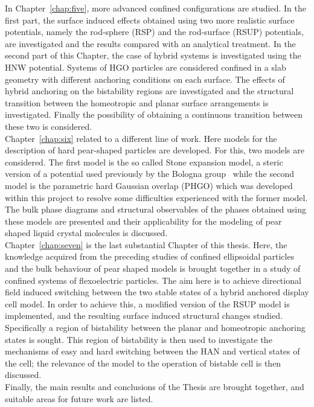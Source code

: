 In Chapter~\ref{chap:five}, more advanced confined configurations are studied. In the first part,
the surface induced effects obtained using two more realistic surface potentials, namely the rod-sphere
(RSP) and the rod-surface (RSUP) potentials, are investigated and the results compared
with an analytical treatment.
In the second part of this Chapter, the case of hybrid systems is investigated using the HNW
potential. Systems of HGO particles are considered confined in a slab geometry with different 
anchoring conditions on each surface. The effects of hybrid anchoring on the bistability regions
are investigated and the structural transition between the homeotropic and planar surface
arrangements is investigated.  Finally the possibility of obtaining a continuous transition
between these two is considered.\\

Chapter~\ref{chap:six} related to a different line of work. Here models for the description of hard
pear-shaped particles are developed. For this, two models are considered. The first model is
the so called Stone expansion model,  a steric version of a potential used previously by
the Bologna group~\cite{BerardiRicci01} while the second model is the parametric hard Gaussian 
overlap (PHGO) which was developed within
this project to resolve some difficulties experienced with the former model. The bulk phase diagrams
and structural observables of the phases obtained using these models are presented and their
applicability for the modeling of pear shaped liquid crystal molecules is discussed.\\

Chapter~\ref{chap:seven} is the last substantial Chapter of this thesis. Here, the knowledge 
acquired from the preceding studies of
confined ellipsoidal particles and the bulk behaviour of pear shaped models is brought together
in a study of confined systems of flexoelectric particles. The aim here is to achieve
directional field induced switching between the two stable states of a hybrid anchored display 
cell model.
In order to achieve this, a modified version of the RSUP model is implemented, 
and the resulting surface induced structural changes studied.
Specifically a region of bistability between the planar and homeotropic anchoring states 
is sought. This region of bistability is then used to investigate the mechanisms of easy and 
hard switching between the HAN and vertical states of the cell; the relevance of the model 
to the operation of bistable cell is then discussed.\\

Finally, the main results and conclusions of the Thesis are brought together, and suitable areas
for future work are listed.


